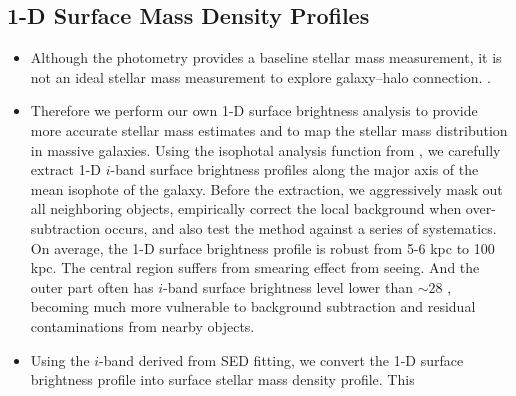 \documentclass[a4paper,fleqn,usenatbib]{mnras}
\begin{document}

\subsection{1-D Surface Mass Density Profiles}
    \label{sec:1d_prof}

	\begin{itemize}
	
		\item Although the \cmod{} photometry provides a baseline stellar mass measurement,
			it is not an ideal stellar mass measurement to explore galaxy--halo connection.
			.
			
		\item Therefore we perform our own 1-D surface brightness analysis to provide
			more accurate stellar mass estimates and to map the stellar mass 
			distribution in massive galaxies. 
			Using the \ellipse{} isophotal analysis function from \iraf{}, we carefully 
			extract 1-D $i$-band surface brightness profiles along the major axis of the 
			mean isophote of the galaxy. 
			Before the extraction, we aggressively mask out all neighboring objects, 
			empirically correct the local background when over-subtraction occurs, and 
			also test the method against a series of systematics. 
			On average, the 1-D surface brightness profile is robust from 5-6 kpc to 100 kpc.
			The central region suffers from smearing effect from seeing. 
			And the outer part often has $i$-band surface brightness level lower than 
			$\sim 28$ \sb{}, becoming much more vulnerable to background subtraction 
			and residual contaminations from nearby objects.
		
		\item Using the $i$-band \mlratio{} derived from SED fitting, we convert the 
			1-D surface brightness profile into surface stellar mass density profile.
			This 
			
	
					
	\end{itemize}


\end{document}

